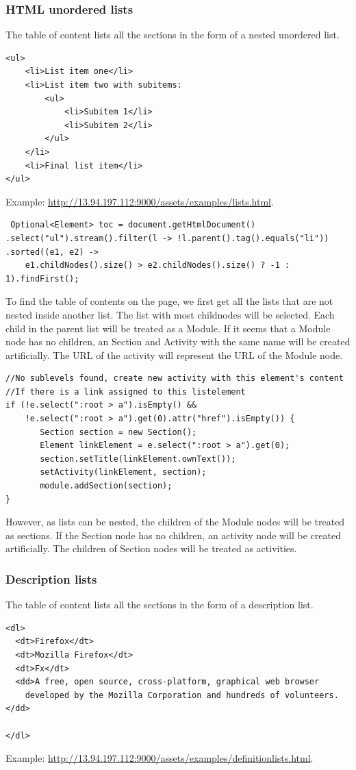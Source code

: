 \documentclass[a4paper,12pt]{article}
\begin{document}
\subsubsection*{HTML unordered lists}
The table of content lists all the sections in the form of a nested unordered list.
\begin{lstlisting}
<ul>
    <li>List item one</li>
    <li>List item two with subitems:
        <ul>
            <li>Subitem 1</li>
            <li>Subitem 2</li>
        </ul>
    </li>
    <li>Final list item</li>
</ul>
\end{lstlisting}
Example: \url{http://13.94.197.112:9000/assets/examples/lists.html}.
\begin{lstlisting}
 Optional<Element> toc = document.getHtmlDocument()
.select("ul").stream().filter(l -> !l.parent().tag().equals("li"))
.sorted((e1, e2) -> 
    e1.childNodes().size() > e2.childNodes().size() ? -1 : 1).findFirst();
\end{lstlisting}
To find the table of contents on the page, we first get all the lists that are not nested inside another list. The list with most childnodes will be selected. Each child in the parent list will be treated as a Module. If it seems that a Module node has no children, an Section and Activity with the same name will be created artificially. The URL of the activity will represent the URL of the Module node. 
\begin{lstlisting}
//No sublevels found, create new activity with this element's content
//If there is a link assigned to this listelement
if (!e.select(":root > a").isEmpty() && 
    !e.select(":root > a").get(0).attr("href").isEmpty()) {
       Section section = new Section();
       Element linkElement = e.select(":root > a").get(0);
       section.setTitle(linkElement.ownText());
       setActivity(linkElement, section);
       module.addSection(section);
}
\end{lstlisting}


However, as lists can be nested, the children of the Module nodes will be treated as sections. If the Section node has no children, an activity node will be created artificially. The children of Section nodes will be treated as activities.
\subsubsection*{Description lists}
The table of content lists all the sections in the form of a description list.
\begin{lstlisting}
<dl>
  <dt>Firefox</dt>
  <dt>Mozilla Firefox</dt>
  <dt>Fx</dt>
  <dd>A free, open source, cross-platform, graphical web browser
    developed by the Mozilla Corporation and hundreds of volunteers.</dd>

</dl>
\end{lstlisting}
Example: \url{http://13.94.197.112:9000/assets/examples/definitionlists.html}.
\end{document}
